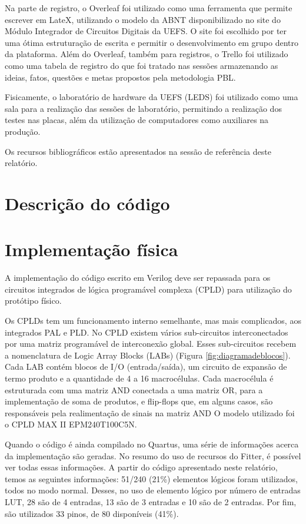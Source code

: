 Na parte de registro, o Overleaf foi utilizado como uma ferramenta que permite escrever em LateX, utilizando o modelo da ABNT disponibilizado no site do Módulo Integrador de Circuitos Digitais da UEFS. O site foi escolhido por ter uma ótima estruturação de escrita e permitir o desenvolvimento em grupo dentro da plataforma. Além do Overleaf, também para registros, o Trello foi utilizado como uma tabela de registro do que foi tratado nas sessões armazenando as ideias, fatos, questões e metas propostos pela metodologia PBL.

Fisicamente, o laboratório de hardware da UEFS (LEDS) foi utilizado como uma sala para a realização das sessões de laboratório, permitindo a realização dos testes nas placas, além da utilização de computadores como auxiliares na produção.

Os recursos bibliográficos estão apresentados na sessão de referência deste relatório.




\section{Descrição do código}
\section{Implementação física}

A implementação do código escrito em Verilog deve ser repassada para os circuitos integrados de lógica programável complexa (CPLD) para utilização do protótipo físico. 

Os CPLDs tem um funcionamento interno semelhante, mas mais complicados, aos integrados PAL e PLD. No CPLD existem vários sub-circuitos interconectados por uma matriz programável de interconexão global. Esses sub-circuitos recebem a nomenclatura de Logic Array Blocks (LABs) (Figura \ref{fig:diagramadeblocos}). Cada LAB contém blocos de I/O (entrada/saída), um circuito de expansão de termo produto e a quantidade de 4 a 16 macrocélulas. Cada macrocélula é estruturada com uma matriz AND conectada a uma matriz OR, para a implementação de soma de produtos, e flip-flops que, em alguns casos, são responsáveis pela realimentação de sinais na matriz AND \cite{CLPDarquitetura} O modelo utilizado foi o CPLD MAX II EPM240T100C5N.

Quando o código é ainda compilado no Quartus, uma série de informações acerca da implementação são geradas. No resumo do uso de recursos do Fitter, é possível ver todas essas informações. A partir do código apresentado neste relatório, temos as seguintes informações: 51/240 (21\%) elementos lógicos foram utilizados, todos no modo normal. Desses, no uso de elemento lógico por número de entradas LUT, 28 são de 4 entradas, 13 são de 3 entradas e 10 são de 2 entradas. Por fim, são utilizados 33 pinos, de 80 disponíveis (41\%).

